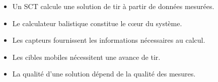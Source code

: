\begin{aretenir}

\begin{itemize}
    \item Un SCT calcule une solution de tir à partir de données mesurées.
    \item Le calculateur balistique constitue le cœur du système.
    \item Les capteurs fournissent les informations nécessaires au calcul.
    \item Les cibles mobiles nécessitent une avance de tir.
    \item La qualité d'une solution dépend de la qualité des mesures.
\end{itemize}

\end{aretenir}
